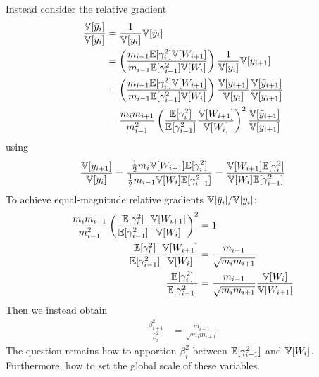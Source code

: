 Instead consider the relative gradient
\begin{align}
\frac{ \mathbb{V}[\bar{y}_{i}] }{ \mathbb{V}[y_{i}] }
& = \frac{1}{\mathbb{V}[y_{i}]} \mathbb{V}[\bar{y}_{i}] \\
& = \left( \frac{ m_{i+1} \mathbb{E}[\gamma_{i}^2] \mathbb{V}[W_{i+1}] }{ m_{i-1} \mathbb{E}[\gamma_{i-1}^2] \mathbb{V}[W_{i}]} \right) \frac{1}{\mathbb{V}[y_{i}]} \mathbb{V}[\bar{y}_{i+1}] \\
& = \left( \frac{ m_{i+1} \mathbb{E}[\gamma_{i}^2] \mathbb{V}[W_{i+1}] }{ m_{i-1} \mathbb{E}[\gamma_{i-1}^2] \mathbb{V}[W_{i}]} \right) \frac{\mathbb{V}[y_{i+1}]}{\mathbb{V}[y_{i}]} \frac{\mathbb{V}[\bar{y}_{i+1}]}{\mathbb{V}[y_{i+1}]} \\
& = \frac{ m_{i} m_{i+1} }{ m_{i-1}^2 } \left( \frac{\mathbb{E}[\gamma_{i}^2] }{ \mathbb{E}[\gamma_{i-1}^2] } \frac{ \mathbb{V}[W_{i+1}] }{ \mathbb{V}[W_{i}] } \right)^2 \frac{\mathbb{V}[\bar{y}_{i+1}]}{\mathbb{V}[y_{i+1}]}
\end{align}
using
\begin{equation}
\frac{\mathbb{V}[y_{i+1}]}{\mathbb{V}[y_{i}]}
= \frac{ \tfrac{1}{2} m_{i} \mathbb{V}[W_{i+1}] \mathbb{E}[\gamma_{i}^2] }{ \tfrac{1}{2} m_{i-1} \mathbb{V}[W_{i}] \mathbb{E}[\gamma_{i-1}^2] }
= \frac{  \mathbb{V}[W_{i+1}] \mathbb{E}[\gamma_{i}^2] }{  \mathbb{V}[W_{i}] \mathbb{E}[\gamma_{i-1}^2] } \\
\end{equation}
To achieve equal-magnitude relative gradients $\mathbb{V}[\bar{y}_{i}] / \mathbb{V}[y_{i}]$:
\begin{align}
\frac{ m_{i} m_{i+1} }{ m_{i-1}^2 } \left( \frac{\mathbb{E}[\gamma_{i}^2] }{ \mathbb{E}[\gamma_{i-1}^2] } \frac{ \mathbb{V}[W_{i+1}] }{ \mathbb{V}[W_{i}] } \right)^2 & = 1 \\
\frac{\mathbb{E}[\gamma_{i}^2] }{ \mathbb{E}[\gamma_{i-1}^2] } \frac{ \mathbb{V}[W_{i+1}] }{ \mathbb{V}[W_{i}] } & = \frac{m_{i-1}}{\sqrt{m_{i} m_{i+1}}} \\
\frac{\mathbb{E}[\gamma_{i}^2] }{ \mathbb{E}[\gamma_{i-1}^2] } & = \frac{m_{i-1}}{\sqrt{m_{i} m_{i+1}}} \frac{\mathbb{V}[W_{i}]}{\mathbb{V}[W_{i+1}]}
\end{align}
Then we instead obtain
\begin{align}
\frac{\beta_{i+1}^2}{\beta_{i}^2} & = \frac{m_{i-1}}{\sqrt{m_{i} m_{i+1}}}
\end{align}
The question remains how to apportion $\beta_{i}^2$ between $\mathbb{E}[\gamma_{i-1}^2]$ and $\mathbb{V}[W_{i}]$.
Furthermore, how to set the global scale of these variables.

